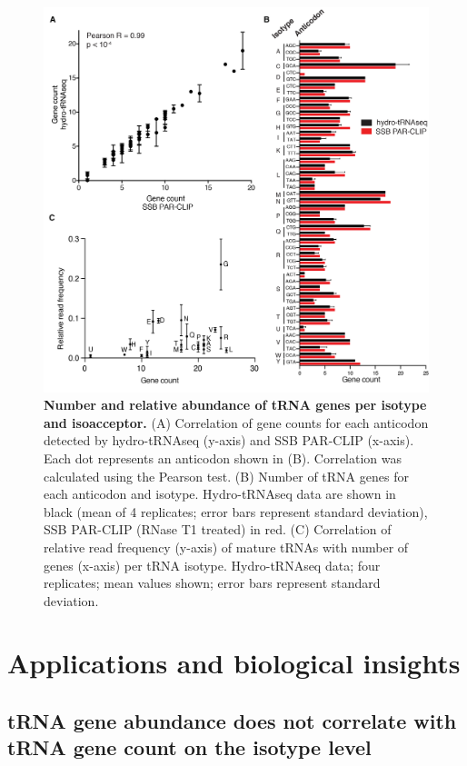 \documentclass[12pt]{rockefeller}
\begin{document}
\begin{figure}[!h]%
\centering
\includegraphics[width=\textwidth]{paper4.png}%
\caption[Number and relative abundance of tRNA genes per isotype and isoacceptor.]
{\textbf{Number and relative abundance of tRNA genes per isotype and isoacceptor.}
(A) Correlation of gene counts for each anticodon detected by hydro-tRNAseq (y-axis) and SSB PAR-CLIP (x-axis). Each dot represents an anticodon shown in (B). Correlation was calculated using the Pearson test. (B) Number of tRNA genes for each anticodon and isotype. Hydro-tRNAseq data are shown in black (mean of 4 replicates; error bars represent standard deviation), SSB PAR-CLIP (RNase T1 treated) in red. (C) Correlation of relative read frequency (y-axis) of mature tRNAs with number of genes (x-axis) per tRNA isotype. Hydro-tRNAseq data; four replicates; mean values shown; error bars represent standard deviation.}
\centering
\label{paper4}%
\end{figure}

\chapter{Applications and biological insights}\label{applications}

\section{tRNA gene abundance does not correlate with tRNA gene count on the isotype level}
\end{document}
